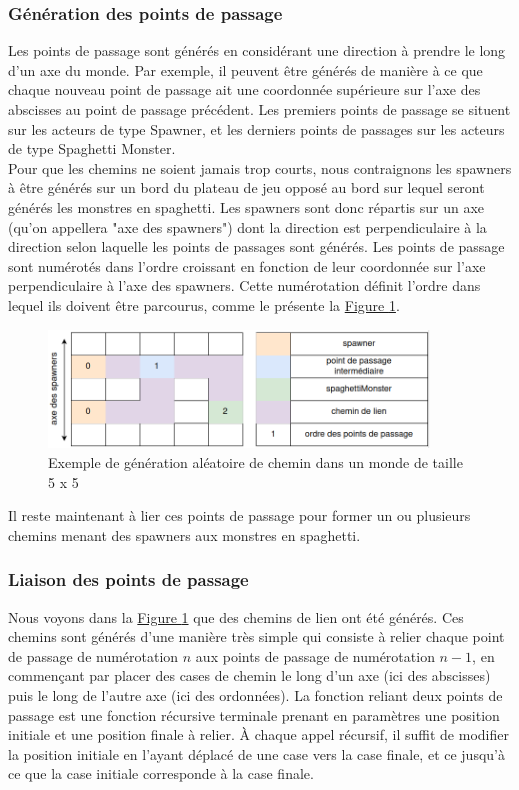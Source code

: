 \documentclass{article}
\begin{document}
\subsubsection{Génération des points de passage}
Les points de passage sont générés en considérant une direction à prendre le long d'un axe du monde. Par exemple, il peuvent être générés de manière à ce que chaque nouveau point de passage ait une coordonnée supérieure sur l'axe des abscisses au point de passage précédent.
Les premiers points de passage se situent sur les acteurs de type Spawner, et les derniers points de passages sur les acteurs de type Spaghetti Monster.\\
Pour que les chemins ne soient jamais trop courts, nous contraignons les spawners à être générés sur un bord du plateau de jeu opposé au bord sur lequel seront générés les monstres en spaghetti.
Les spawners sont donc répartis sur un axe (qu'on appellera "axe des spawners") dont la direction est perpendiculaire à la direction selon laquelle les points de passages sont générés. Les points de passage sont numérotés dans l'ordre croissant en fonction de leur coordonnée sur l'axe perpendiculaire à l'axe des spawners. Cette numérotation définit l'ordre dans lequel ils doivent être parcourus, comme le présente la \hyperref[fig:points de passage]{Figure \ref{fig:points de passage}}.

\begin{figure}[H]
    \centering
    \includegraphics[width = 0.9\textwidth]{points_de_passage.png}
    \caption{Exemple de génération aléatoire de chemin dans un monde de taille 5 x 5}
    \label{fig:points de passage}
\end{figure}

Il reste maintenant à lier ces points de passage pour former un ou plusieurs chemins menant des spawners aux monstres en spaghetti.

\subsubsection{Liaison des points de passage}

Nous voyons dans la \hyperref[fig:points de passage]{Figure \ref{fig:points de passage}} que des chemins de lien ont été générés. Ces chemins sont générés d'une manière très simple qui consiste à relier chaque point de passage de numérotation $n$ aux points de passage de numérotation $n - 1$, en commençant par placer des cases de chemin le long d'un axe (ici des abscisses) puis le long de l'autre axe (ici des ordonnées). La fonction reliant deux points de passage est une fonction récursive terminale prenant en paramètres une position initiale et une position finale à relier. À chaque appel récursif, il suffit de modifier la position initiale en l'ayant déplacé de une case vers la case finale, et ce jusqu'à ce que la case initiale corresponde à la case finale.
\end{document}
